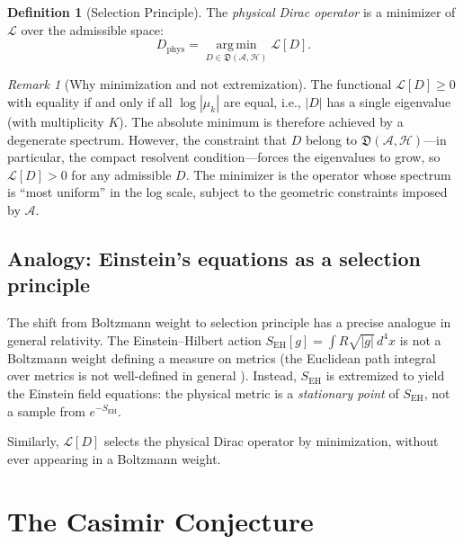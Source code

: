 \documentclass[12pt]{article}
\theoremstyle{definition}
\newtheorem{definition}[theorem]{Definition}
\theoremstyle{remark}
\newtheorem{remark}[theorem]{Remark}
\begin{document}
\begin{definition}[Selection Principle]\label{def:principle}
The \emph{physical Dirac operator} is a minimizer of $\mathcal{L}$
over the admissible space:
\begin{equation}\label{eq:min}
  D_{\mathrm{phys}}
  = \operatorname*{arg\,min}_{D \in \mathfrak{D}(\mathcal{A},\mathcal{H})}
    \mathcal{L}[D].
\end{equation}
\end{definition}

\begin{remark}[Why minimization and not extremization]
The functional $\mathcal{L}[D] \geq 0$ with equality if and only if
all $\log|\mu_k|$ are equal, i.e., $|D|$ has a single eigenvalue
(with multiplicity $K$).  The absolute minimum is therefore achieved
by a degenerate spectrum.  However, the constraint that $D$ belong to
$\mathfrak{D}(\mathcal{A},\mathcal{H})$---in particular, the compact
resolvent condition---forces the eigenvalues to grow, so
$\mathcal{L}[D] > 0$ for any admissible $D$.  The minimizer is the
operator whose spectrum is ``most uniform'' in the log scale,
subject to the geometric constraints imposed by $\mathcal{A}$.
\end{remark}

\subsection{Analogy: Einstein's equations as a selection principle}

The shift from Boltzmann weight to selection principle has a precise
analogue in general relativity.  The Einstein--Hilbert action
$S_{\mathrm{EH}}[g] = \int R\sqrt{|g|}\,d^4x$ is not a Boltzmann
weight defining a measure on metrics (the Euclidean path integral
over metrics is not well-defined in general \cite{GibbonsHawking1977}).
Instead, $S_{\mathrm{EH}}$ is extremized to yield the Einstein
field equations: the physical metric is a \emph{stationary point} of
$S_{\mathrm{EH}}$, not a sample from $e^{-S_{\mathrm{EH}}}$.

Similarly, $\mathcal{L}[D]$ selects the physical Dirac operator by
minimization, without ever appearing in a Boltzmann weight.

\section{The Casimir Conjecture}
\label{sec:casimir}
\end{document}
